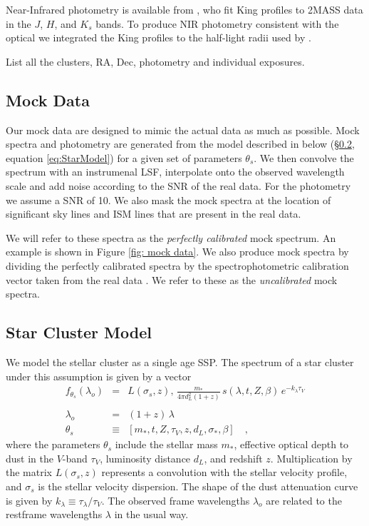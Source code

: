 \documentclass[iop,numberedappendix]{emulateapj}
\begin{document}
Near-Infrared photometry is available from \citet{cohen07}, who fit
King profiles \citet{king65} to 2MASS data in the $J$, $H$, and $K_s$
bands.  To produce NIR photometry consistent with the optical we
integrated the King profiles to the half-light radii used by
\citet{vanderbeke14}.

\begin{table}[h!]
\caption{List all the clusters, RA, Dec, photometry and individual exposures.}
\end{table}


\subsection{Mock Data}
Our mock data are designed to mimic the actual data as much as
possible.  Mock spectra and photometry are generated from the model
described in below (\S\ref{sec:cluster_model}, equation
\ref{eq:StarModel}) for a given set of parameters $\theta_s$.  We then
convolve the spectrum with an instrumenal LSF, interpolate onto the
observed wavelength scale and add noise according to the SNR of the
real data.  For the photometry we assume a SNR of 10.  We also mask
the mock spectra at the location of significant sky lines and ISM
lines that are present in the real data.

We will refer to these spectra as the \emph{perfectly calibrated} mock
spectrum.  An example is shown in Figure \ref{fig: mock data}. We also
produce mock spectra by dividing the perfectly calibrated spectra by
the spectrophotometric calibration vector taken from the real data
\citep[][Fig\ref{fig:ggc_spectrum}]{schiavon05}.  We refer to these as
the \emph{uncalibrated} mock spectra.

\subsection{Star Cluster Model}
\label{sec:cluster_model}
We model the stellar cluster as a single age SSP. The spectrum of a
star cluster under this assumption is given by a vector
\begin{eqnarray} \label{eq:StarModel}\displaystyle
f_{\theta_s}(\lambda_o) & = &
L(\sigma_s, z) ,\, \frac{m_*}{4\pi d_L^2(1+z)} \, s(\lambda, t, Z , \beta) \, e^ {-k_\lambda\tau_V} \\
\nonumber \\ 
\lambda_o & = & (1+z)\,\lambda 
\\
\theta_s & \equiv & \left[ m_*, t, Z, \tau_V, z, d_L, \sigma_*, \beta \right]
\quad ,
\end{eqnarray} where the
parameters $\theta_s$ include 
the stellar mass $m_*$, 
effective optical depth to dust in the $V$-band $\tau_V$, 
luminosity distance $d_L$,
and redshift $z$.
Multiplication by the matrix $L(\sigma_s, z)$ represents a convolution
with the stellar velocity profile,
and $\sigma_s$ is the stellar velocity dispersion. 
The shape of the dust attenuation curve is given by $k_\lambda \equiv
\tau_\lambda/\tau_V$.  
The observed frame wavelengths $\lambda_o$ are related to the
restframe wavelengths $\lambda$ in the usual way.
\end{document}
